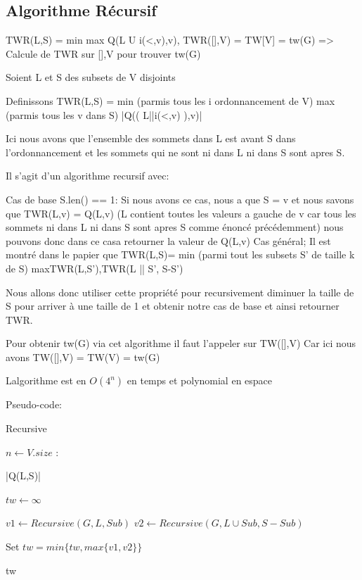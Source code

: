 \documentclass[a4paper, 12pt]{article}
\begin{document}
\subsection{Algorithme Récursif}
TWR(L,S) = min max Q(L U i(<,v),v),
TWR([],V) = TW[V] = tw(G)
=> Calcule de TWR sur [],V pour trouver tw(G)



Soient L et S des subsets de V disjoints

Definissons TWR(L,S) = min (parmis tous les i ordonnancement de V) max (parmis tous les v dans S) |Q(( L||i(<,v) ),v)|

Ici nous avons que l'ensemble des sommets dans L est avant S dans l'ordonnancement et les sommets qui ne sont ni dans L ni dans S sont apres S.

Il s'agit d'un algorithme recursif avec:

Cas de base S.len() == 1:
  Si nous avons ce cas, nous a que S = {v} et nous savons que TWR(L,{v}) = Q(L,v) (L contient toutes les valeurs a gauche de v car tous les sommets ni dans L ni dans S sont apres S comme énoncé précédemment) nous pouvons donc dans ce casa retourner la valeur de Q(L,v) 
Cas général;
Il est montré dans le papier que TWR(L,S)= min (parmi tout les subsets S' de taille k de S) max{TWR(L,S'),TWR(L || S', S-S')} 

Nous allons donc utiliser cette propriété pour recursivement diminuer la taille de S pour arriver à une taille de 1 et obtenir notre cas de base et ainsi retourner TWR.

Pour obtenir tw(G) via cet algorithme il faut l'appeler sur TW([],V)
Car ici nous avons TW([],V) = TW(V) = tw(G)

Lalgorithme est en $O(4^n)$ en temps et polynomial en espace 

Pseudo-code:
\begin{algorithm}[hbt!]
\caption{Recursive}\label{alg:tw_rec}
\begin{algorithmic}

  \State $n \gets V.size$
  :
  
   \Return |Q(L,S)|
  \EndIf
  
  \State $tw \gets \infty$

   \do

    \State $v1 \gets Recursive(G,L,Sub)$
    \State $v2 \gets Recursive(G,L \cup Sub,S-Sub)$
    
    \State Set $tw = min\{tw,max\{v1,v2\}\}$
  
  \EndFor

  \State \Return tw
\end{algorithmic}
\end{algorithm}
\end{document}
